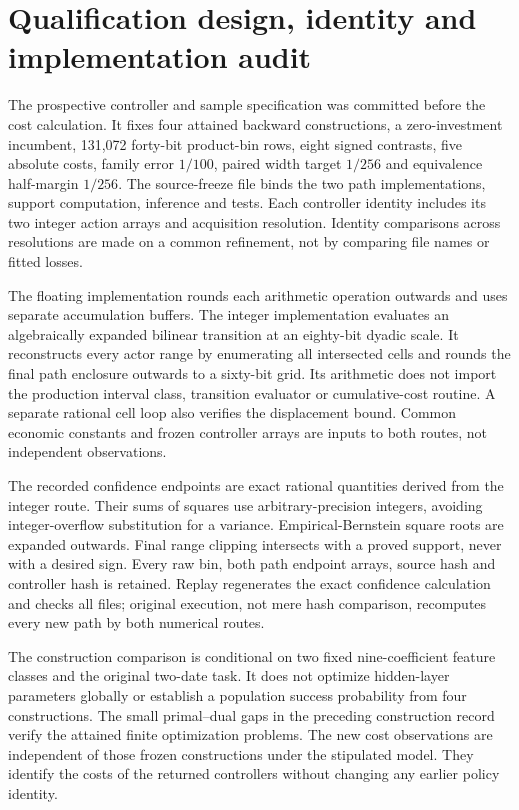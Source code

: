 \section{Qualification design, identity and implementation audit}\label{app:audit75}
The prospective controller and sample specification was committed before the cost calculation. It fixes four attained backward constructions, a zero-investment incumbent, 131,072 forty-bit product-bin rows, eight signed contrasts, five absolute costs, family error $1/100$, paired width target $1/256$ and equivalence half-margin $1/256$. The source-freeze file binds the two path implementations, support computation, inference and tests. Each controller identity includes its two integer action arrays and acquisition resolution. Identity comparisons across resolutions are made on a common refinement, not by comparing file names or fitted losses.

The floating implementation rounds each arithmetic operation outwards and uses separate accumulation buffers. The integer implementation evaluates an algebraically expanded bilinear transition at an eighty-bit dyadic scale. It reconstructs every actor range by enumerating all intersected cells and rounds the final path enclosure outwards to a sixty-bit grid. Its arithmetic does not import the production interval class, transition evaluator or cumulative-cost routine. A separate rational cell loop also verifies the displacement bound. Common economic constants and frozen controller arrays are inputs to both routes, not independent observations.

The recorded confidence endpoints are exact rational quantities derived from the integer route. Their sums of squares use arbitrary-precision integers, avoiding integer-overflow substitution for a variance. Empirical-Bernstein square roots are expanded outwards. Final range clipping intersects with a proved support, never with a desired sign. Every raw bin, both path endpoint arrays, source hash and controller hash is retained. Replay regenerates the exact confidence calculation and checks all files; original execution, not mere hash comparison, recomputes every new path by both numerical routes.

The construction comparison is conditional on two fixed nine-coefficient feature classes and the original two-date task. It does not optimize hidden-layer parameters globally or establish a population success probability from four constructions. The small primal--dual gaps in the preceding construction record verify the attained finite optimization problems. The new cost observations are independent of those frozen constructions under the stipulated model. They identify the costs of the returned controllers without changing any earlier policy identity.

